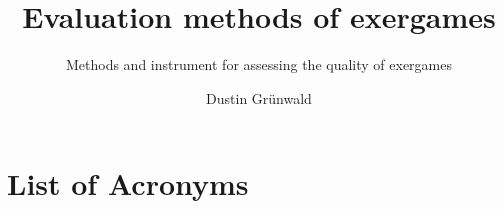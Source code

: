 \documentclass[
	language=english, %
	thesis={type=Seminar Paper}, %
	class=report,%
	ruledheaders=section,%
	accentcolor=3d,%
	marginpar=false,%
	parskip=half-,%
	fontsize=11pt,%
	IMRAD=false %
]{tudapub}
\begin{document}

\title{Evaluation methods of exergames}
\subtitle{Methods and instrument for assessing the quality of exergames}
\author[D. Grünwald]{Dustin Grünwald} %



\maketitle
\affidavit %
\tableofcontents

\begin{multicols}{2}

\end{multicols}
\clearpage
\chapter*{List of Acronyms}
\printacronyms[heading={none}]

\printbibliography

\appendix

\languagename
\end{document}
